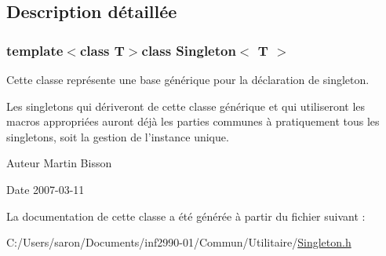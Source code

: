 \subsection{Description détaillée}
\subsubsection*{template$<$class T$>$class Singleton$<$ T $>$}

Cette classe représente une base générique pour la déclaration de singleton. 

Les singletons qui dériveront de cette classe générique et qui utiliseront les macros appropriées auront déjà les parties communes à pratiquement tous les singletons, soit la gestion de l'instance unique.

\begin{DoxyAuthor}{Auteur}
Martin Bisson 
\end{DoxyAuthor}
\begin{DoxyDate}{Date}
2007-\/03-\/11 
\end{DoxyDate}


La documentation de cette classe a été générée à partir du fichier suivant \-:\begin{DoxyCompactItemize}
\item 
C\-:/\-Users/saron/\-Documents/inf2990-\/01/\-Commun/\-Utilitaire/\hyperlink{_singleton_8h}{Singleton.\-h}\end{DoxyCompactItemize}
